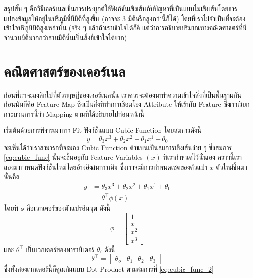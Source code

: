 สรุปสั้น ๆ คือวิธีเคอร์เนลเป็นการประยุกต์ใช้ฟังก์ชันเชิงเส้นกับปัญหาที่เป็นแบบไม่เชิงเส้นโดยการแปลงข้อมูลให้อยู่ในปริภูมิที่มีมิติที่สูงขึ้น (อาจจะ 3 มิติหรือสูงกว่านี้ก็ได้) โดยที่เราไม่จำเป็นที่จะต้องเข้าใจปริภูมิมิติสูงเหล่านั้น (จริง ๆ แล้วถ้าเราเข้าใจได้ก็ดี แต่ว่าการอธิบายปริมาณทางคณิตศาสตร์ที่มีจำนวนมิติมากกว่าสามมิตินั้นเป็นสิ่งที่เข้าใจได้ยาก)

\section{คณิตศาสตร์ของเคอร์เนล}
\label{sec:math_kernel}

ก่อนที่เราจะลงลึกไปที่ตัวทฤษฎีของเคอร์เนลนั้น เราควรจะต้องมาทำความเข้าใจสิ่งที่เป็นพื้นฐานกันก่อนนั่นก็คือ Feature Map ซึ่งเป็นสิ่งที่ทำการเชื่อมโยง Attribute ให้เข้ากับ Feature ซึ่งเราเรียกกระบวนการนี้ว่า Mapping ตามที่ได้อธิบายไปก่อนหน้านี้

เริ่มต้นด้วยการพิจารณาการ Fit ฟังก์ชันแบบ Cubic Function โดยสมการดังนี้
%
\begin{equation}\label{eq:cubic_func}
    y = \theta_{3}x^{3} + \theta_{2}x^{2} + \theta_{1}x^{1} + \theta_{0}
\end{equation}
%
\noindent จะเห็นได้ว่าเราสามารถที่จะมอง Cubic Function ด้านบนเป็นสมการเชิงเส้นง่าย ๆ ซึ่งสมการ \eqref{eq:cubic_func} นั้นจะขึ้นอยู่กับ Feature Variables $(x)$ ที่เรากำหนดไว้นั่นเอง คราวนี้เราลองมากำหนดฟังก์ชันใหม่โดยอ้างอิงสมการเดิม ซึ่งเราจะมีการกำหนดเซตของตัวแปร $x$ ตัวใหม่ขึ้นมานั่นคือ
%
\begin{align}\label{eq:cubic_func_2}
    y & = \theta_{3}x^{3} + \theta_{2}x^{2} + \theta_{1}x^{1} + \theta_{0} \nonumber \\
      & = \theta^{\top}\phi(x)
\end{align}
%
\noindent โดยที่ $\phi$ คือเวกเตอร์ของตัวแปรอินพุต ดังนี้
%
\begin{equation}
    \phi =
    \begin{bmatrix}
        1     \\
        x     \\
        x^{2} \\
        x^{3}
    \end{bmatrix}
\end{equation}
%
\noindent และ $\theta^{\top}$ เป็นเวกเตอร์ของพารามิเตอร์ $\theta_{i}$ ดังนี้
%
\begin{equation}
    \theta^{\top} =
    \begin{bmatrix}
        \theta_{o} & \theta_{1} & \theta_{2} & \theta_{3}
    \end{bmatrix}
\end{equation}
%
\noindent ซึ่งทั้งสองเวกเตอร์นี้ก็คูณกันแบบ Dot Product ตามสมการที่ \eqref{eq:cubic_func_2}

